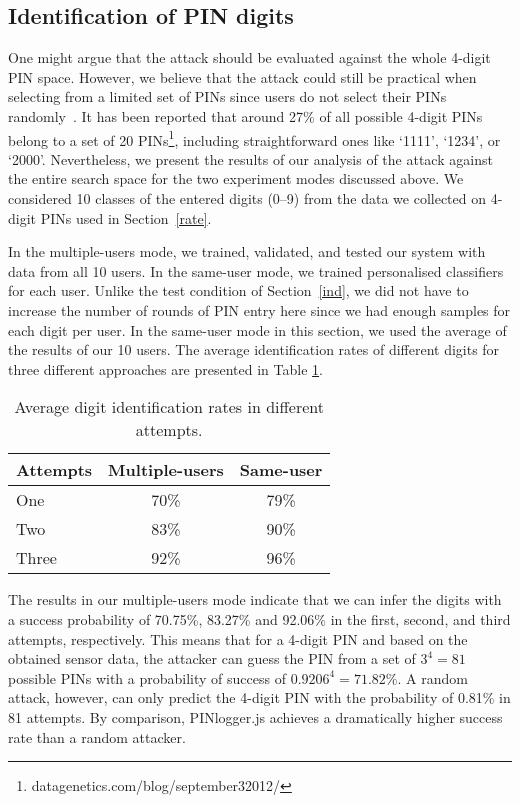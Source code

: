 \documentclass[10pt,twocolumn]{article}
\begin{document}
\subsection{Identification of PIN digits}
One might argue that the attack should be evaluated against the whole 4-digit PIN space. However, we believe that the attack could still be practical when selecting from a limited set of PINs since users do not select their PINs randomly~\cite{randomPINs}. It has been reported that around 27\% of all possible 4-digit PINs belong to a set of 20 PINs\footnote{datagenetics.com/blog/september32012/}, including straightforward ones like `1111', `1234', or `2000'. 
Nevertheless, we present the results of our analysis of the attack against the entire search space for the two experiment modes discussed above. We considered 10 classes of the entered digits (0--9) from the data we collected on 4-digit PINs used in Section~\ref{rate}.

In the multiple-users mode, we trained, validated, and tested our system with data from all 10 users. In the same-user mode, we trained personalised classifiers for each user. 
Unlike the test condition of Section~\ref{ind}, we did not have to increase the number of rounds of PIN entry here since we had enough samples for each digit per user. In the same-user mode in this section, we used the average of the results of our 10 users.  
The average identification rates of different digits for three different approaches are presented in Table \ref{allusersDigits}.
\begin{table}[t]
\centering
\begin{tabular}{|l|c|c|}
\hline
Attempts  
& Multiple-users & Same-user \\ 
\hline
One & 70\% & 79\% \\
Two & 83\% & 90\%\\
Three & 92\% & 96\% \\
\hline
\end{tabular}
\caption {Average digit identification rates in different attempts.}
\label{allusersDigits}
\end{table}


The results in our multiple-users mode indicate that we can infer the digits with a success probability of 70.75\%, 83.27\% and 92.06\% in the first, second, and third attempts, respectively. 
This means that for a 4-digit PIN and based on the obtained sensor data, the attacker can guess the PIN from a set of $3^4 = 81$ possible PINs with a probability of success of $0.9206^4 = 71.82\%$. 
A random attack, however, can only predict the 4-digit PIN with the probability of 0.81\% in 81 attempts. By comparison, PINlogger.js achieves a dramatically higher success rate than a random attacker.
\end{document}
